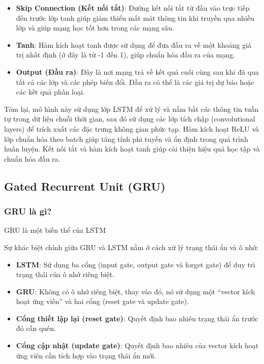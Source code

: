 \documentclass[conference]{IEEEtran}
\begin{document}
\begin{itemize}
    \item \textbf{Skip Connection (Kết nối tắt)}: Đường kết nối tắt từ đầu vào trực tiếp đến trước lớp tanh giúp giảm thiểu mất mát thông tin khi truyền qua nhiều lớp và giúp mạng học tốt hơn trong các mạng sâu.

    \item \textbf{Tanh}: Hàm kích hoạt tanh được sử dụng để đưa đầu ra về một khoảng giá trị nhất định (ở đây là từ -1 đến 1), giúp chuẩn hóa đầu ra của mạng.

    \item \textbf{Output (Đầu ra)}: Đây là nơi mạng trả về kết quả cuối cùng sau khi đã qua tất cả các lớp và các phép biến đổi. Đầu ra có thể là các giá trị dự báo hoặc các kết quả phân loại.
\end{itemize}

Tóm lại, mô hình này sử dụng lớp LSTM để xử lý và nắm bắt các thông tin tuần tự trong dữ liệu chuỗi thời gian, sau đó sử dụng các lớp tích chập (convolutional layers) để trích xuất các đặc trưng không gian phức tạp. Hàm kích hoạt ReLU và lớp chuẩn hóa theo batch giúp tăng tính phi tuyến và ổn định trong quá trình huấn luyện. Kết nối tắt và hàm kích hoạt tanh giúp cải thiện hiệu quả học tập và chuẩn hóa đầu ra.


\subsection{Gated Recurrent Unit (GRU)}
\subsubsection{GRU là gì?}
GRU là một biến thể của LSTM

Sự khác biệt chính giữa GRU và LSTM nằm ở cách xử lý trạng thái ẩn và ô nhớ:

\begin{itemize}
    \item \textbf{LSTM}: Sử dụng ba cổng (input gate, output gate và forget gate) để duy trì trạng thái của ô nhớ riêng biệt.
    \item \textbf{GRU}: Không có ô nhớ riêng biệt, thay vào đó, nó sử dụng một “vector kích hoạt ứng viên” và hai cổng (reset gate và update gate).
\end{itemize}

\begin{itemize}
    \item \textbf{Cổng thiết lập lại (reset gate)}: Quyết định bao nhiêu trạng thái ẩn trước đó cần quên.
    \item \textbf{Cổng cập nhật (update gate)}: Quyết định bao nhiêu của vector kích hoạt ứng viên cần tích hợp vào trạng thái ẩn mới.
\end{itemize}
\end{document}
